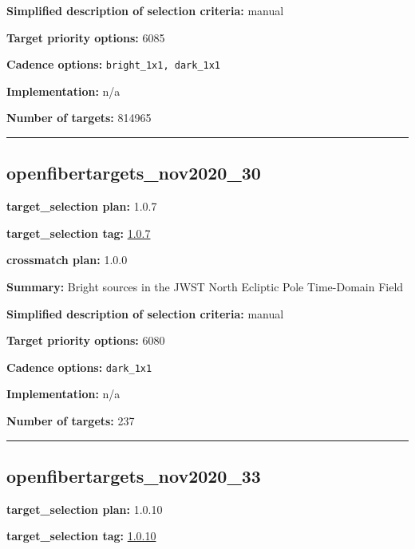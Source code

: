 \noindent\textbf{Simplified description of selection criteria:} manual


\noindent\textbf{Target priority options:} 6085

\noindent\textbf{Cadence options:} \texttt{bright\_1x1,\ dark\_1x1}

\noindent\textbf{Implementation:} n/a

\noindent\textbf{Number of targets:} 814965

\begin{center}\rule{0.5\linewidth}{0.5pt}\end{center}

\hypertarget{openfibertargets_nov2020_30_plan1.0.7}{%
\subsection{openfibertargets\_nov2020\_30}\label{openfibertargets_nov2020_30_plan1.0.7}}

\noindent\textbf{target\_selection plan:} 1.0.7

\noindent\textbf{target\_selection tag:}
\href{https://github.com/sdss/target_selection/tree/1.0.7/}{1.0.7}

\noindent\textbf{crossmatch plan:} 1.0.0

\noindent\textbf{Summary:} Bright sources in the JWST North Ecliptic Pole
Time-Domain Field

\noindent\textbf{Simplified description of selection criteria:} manual


\noindent\textbf{Target priority options:} 6080

\noindent\textbf{Cadence options:} \texttt{dark\_1x1}

\noindent\textbf{Implementation:} n/a

\noindent\textbf{Number of targets:} 237

\begin{center}\rule{0.5\linewidth}{0.5pt}\end{center}

\hypertarget{openfibertargets_nov2020_33_plan1.0.10}{%
\subsection{openfibertargets\_nov2020\_33}\label{openfibertargets_nov2020_33_plan1.0.10}}

\noindent\textbf{target\_selection plan:} 1.0.10

\noindent\textbf{target\_selection tag:}
\href{https://github.com/sdss/target_selection/tree/1.0.10/}{1.0.10}

